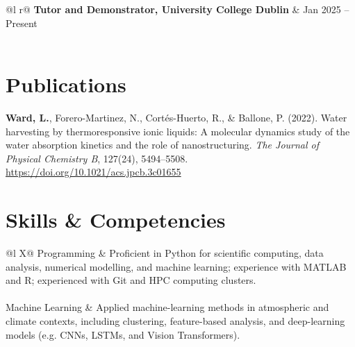 \documentclass[a4paper,12pt]{article}
\begin{document}
{\begin{tabularx}{\linewidth}{@{}l r@{}}
\textbf{Tutor and Demonstrator, University College Dublin} & Jan 2025 -- Present \\[3pt]
 \\
\end{tabularx}

\newpage
\section{Publications}

\textbf{Ward, L.}, Forero-Martinez, N., Cortés-Huerto, R., \& Ballone, P. (2022).
Water harvesting by thermoresponsive ionic liquids: A molecular dynamics study of the water
absorption kinetics and the role of nanostructuring.
\emph{The Journal of Physical Chemistry B}, 127(24), 5494--5508.
\href{https://doi.org/10.1021/acs.jpcb.3c01655}{https://doi.org/10.1021/acs.jpcb.3c01655}
\par\vspace{10pt}
\section{Skills \& Competencies}

\begin{tabularx}{\linewidth}{@{}l X@{}}
Programming &
Proficient in Python for scientific computing, data analysis, numerical modelling, and
machine learning; experience with MATLAB and R; experienced with Git and HPC computing
clusters. \\
 \\

Machine Learning &
Applied machine-learning methods in atmospheric and climate contexts, including clustering,
feature-based analysis, and deep-learning models (e.g. CNNs, LSTMs, and Vision Transformers). \\
 \\


\end{tabularx}}
\end{document}
